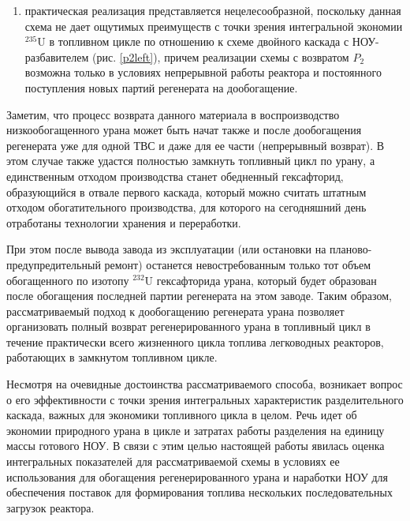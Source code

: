 \begin{enumerate}
    \item практическая реализация представляется нецелесообразной, поскольку данная схема не дает ощутимых преимуществ с точки зрения интегральной экономии $^{235}$U в топливном цикле по отношению к схеме двойного каскада с НОУ-разбавителем (рис. \ref{p2left}), причем реализации схемы с возвратом $P_2$ возможна только в условиях непрерывной работы реактора и постоянного поступления новых партий регенерата на дообогащение.
\end{enumerate}



Заметим, что процесс возврата данного материала в воспроизводство низкообогащенного урана может быть начат также и после дообогащения регенерата уже для одной ТВС и даже для ее части (непрерывный возврат). В этом случае также удастся полностью замкнуть топливный цикл по урану, а единственным отходом производства станет обедненный гексафторид, образующийся в отвале первого каскада, который можно считать штатным отходом обогатительного производства, для которого на сегодняшний день отработаны технологии хранения и переработки.

При этом после вывода завода из эксплуатации (или остановки на планово-предупредительный ремонт) останется невостребованным только тот объем обогащенного по изотопу $^{232}$U гексафторида урана, который будет образован после обогащения последней партии регенерата на этом заводе. Таким образом, рассматриваемый подход к дообогащению регенерата урана позволяет организовать полный возврат регенерированного урана в топливный цикл в течение практически всего жизненного цикла топлива легководных реакторов, работающих в замкнутом топливном цикле.

Несмотря на очевидные достоинства рассматриваемого способа, возникает вопрос о его эффективности с точки зрения интегральных характеристик разделительного каскада, важных для экономики топливного цикла в целом. Речь идет об экономии природного урана в цикле и затратах работы разделения на единицу массы готового НОУ.
В связи с этим целью настоящей работы явилась оценка интегральных показателей для рассматриваемой схемы в условиях ее использования для обогащения регенерированного урана и наработки НОУ для обеспечения поставок для формирования топлива нескольких последовательных загрузок реактора.

